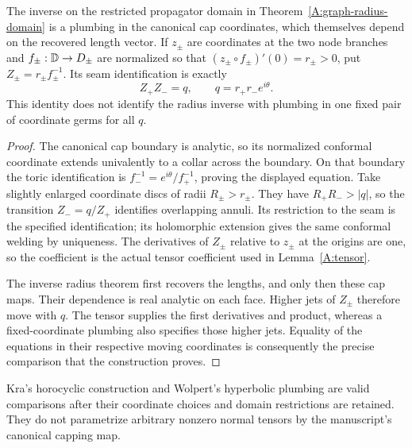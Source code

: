 \begin{proposition}
\label{A:cap-plumbing-equation}
The inverse on the restricted propagator domain in
Theorem~\ref{A:graph-radius-domain} is a plumbing in the canonical cap
coordinates, which themselves depend on the recovered length vector.
If $z_\pm$ are coordinates at the two node branches and
$f_\pm:{\mathbb{D}}\to D_\pm$ are normalized so that
$(z_\pm\circ f_\pm)'(0)=r_\pm>0$, put
$Z_\pm=r_\pm f_\pm^{-1}$. Its seam identification is exactly
\[
                       Z_+Z_-=q,\qquad
             q=r_+r_-e^{i\theta}.
\]
This identity does not identify the radius inverse with plumbing in
one fixed pair of coordinate germs for all $q$.
\end{proposition}

\begin{proof}
The canonical cap boundary is analytic, so its normalized conformal
coordinate extends univalently to a collar across the boundary.
On that boundary the toric identification is
$f_-^{-1}=e^{i\theta}/f_+^{-1}$, proving the displayed equation.
Take slightly enlarged coordinate discs of radii $R_\pm>r_\pm$.
They have $R_+R_->|q|$, so the transition $Z_-=q/Z_+$ identifies
overlapping annuli. Its restriction to the seam is the specified
identification; its holomorphic extension gives the same conformal
welding by uniqueness. The derivatives of $Z_\pm$ relative to
$z_\pm$ at the origins are one, so the coefficient is the actual
tensor coefficient used in Lemma~\ref{A:tensor}.

The inverse radius theorem first recovers the lengths, and only then
these cap maps. Their dependence is real analytic on each face.
Higher jets of $Z_\pm$ therefore move with $q$. The tensor supplies
the first derivatives and product, whereas a fixed-coordinate
plumbing also specifies those higher jets. Equality of the equations
in their respective moving coordinates is consequently the precise
comparison that the construction proves.
\end{proof}

\begin{proposition}
\label{A:plumbing-sources}
Kra's horocyclic construction and Wolpert's hyperbolic plumbing
are valid comparisons after their coordinate choices and domain
restrictions are retained. They do not parametrize arbitrary
nonzero normal tensors by the manuscript's canonical capping map.
\end{proposition}

